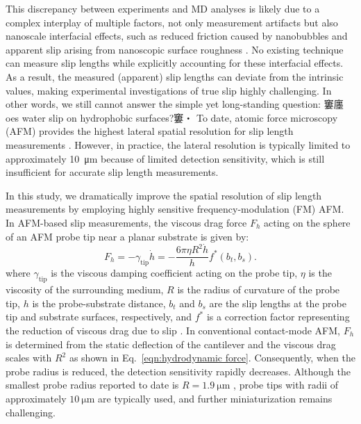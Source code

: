 \documentclass[journal=jacsat,manuscript=article]{achemso}
\begin{document}
This discrepancy between experiments and MD analyses is likely due to a complex interplay of multiple factors, not only measurement artifacts \cite{Pradhan2025-yl}  but also nanoscale interfacial effects, such as reduced friction caused by nanobubbles \cite{Li2016-ly} and apparent slip arising from nanoscopic surface roughness \cite{Lund2012-cr}. No existing technique can measure slip lengths while explicitly accounting for these interfacial effects. As a result, the measured (apparent) slip lengths can deviate from the intrinsic values, making experimental investigations of true slip highly challenging. In other words, we still cannot answer the simple yet long-standing question: 窶廛oes water slip on hydrophobic surfaces?窶・
To date, atomic force microscopy (AFM) provides the highest lateral spatial resolution for slip length measurements \cite{Zhu2012-wb, Vinogradova1995-ct, Vinogradova2003-gh, Li2022-qs}. However, in practice, the lateral resolution is typically limited to approximately \SI{10}{\micro\metre} because of limited detection sensitivity, which is still insufficient for accurate slip length measurements.

In this study, we dramatically improve the spatial resolution of slip length measurements by employing highly sensitive frequency-modulation (FM) AFM. In AFM-based slip measurements, the viscous drag force \(F_h\) acting on the sphere of an AFM probe tip near a planar substrate is given by:
\begin{equation}
F_h=-\gamma_{\text{tip}} \dot{h}=-\frac{6\pi\eta R^2 \dot{h}}{h} f^* (b_t,b_s). \label{eqn:hydrodynamic force}
\end{equation}
where \(\gamma_{\text{tip}}\) is the viscous damping coefficient acting on the probe tip,  \(\eta\) is the viscosity of the surrounding medium, \(R\) is the radius of curvature of the probe tip, \(h\) is the probe-substrate distance, \(b_t\) and \(b_s\) are the slip lengths at the probe tip and substrate surfaces, respectively, and \(f^*\) is a correction factor representing the reduction of viscous drag due to slip \cite{Vinogradova1995-ct}. In conventional contact-mode AFM, \(F_h\) is determined from the static deflection of the cantilever and the viscous drag scales with \(R^2\) as shown in Eq.~\ref{eqn:hydrodynamic force}.  Consequently, when the probe radius is reduced, the detection sensitivity rapidly decreases. Although the smallest probe radius reported to date is \(R = \SI{1.9}{\micro\metre}\) \cite{Vinogradova2003-gh}, probe tips with radii of approximately \(\SI{10}{\micro\metre}\) \cite{Li2022-qs} are typically used, and further miniaturization remains challenging.
\end{document}
